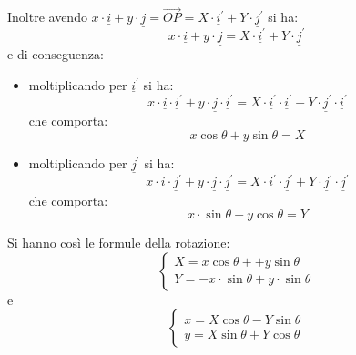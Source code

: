 \documentclass[a4paper,12pt, oneside]{book}
\begin{document}
Inoltre avendo $x\cdot \underline{i}+y\cdot \underline{j}=\vec{OP}=X\cdot \underline{i}^{'}+Y\cdot \underline{j}^{'}$ si ha:
$$x\cdot \underline{i}+y\cdot \underline{j}=X\cdot \underline{i}^{'}+Y\cdot \underline{j}^{'}$$
e di conseguenza:
\begin{itemize}
\item moltiplicando per $\underline{i}^{'}$ si ha:
$$x\cdot \underline{i}\cdot \underline{i}^{'}+y\cdot \underline{j}\cdot \underline{i}^{'}=X\cdot \underline{i}^{'}\cdot \underline{i}^{'}+Y\cdot \underline{j}^{'}\cdot \underline{i}^{'}$$
che comporta:
$$x\cos \theta+y\sin\theta=X$$
\item moltiplicando per $\underline{j}^{'}$ si ha:
$$x\cdot \underline{i}\cdot \underline{j}^{'}+y\cdot \underline{j}\cdot \underline{j}^{'}=X\cdot \underline{i}^{'}\cdot \underline{j}^{'}+Y\cdot \underline{j}^{'}\cdot \underline{j}^{'}$$
che comporta:
$$x\cdot \sin\theta+y\cos\theta=Y$$
\end{itemize}
Si hanno così le formule della rotazione:
$$\begin{cases}
X=x\cos \theta++y\sin\theta\\
Y=-x\cdot\sin\theta+y\cdot \sin\theta
\end{cases}$$
e
$$\begin{cases}
x=X\cos\theta-Y\sin\theta\\
y=X\sin\theta+Y\cos\theta
\end{cases}
$$
\end{document}

